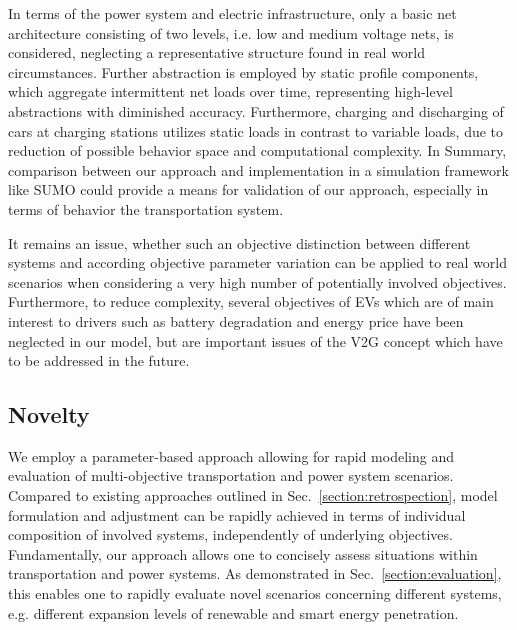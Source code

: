 In terms of the power system and electric infrastructure, only a basic net architecture consisting of two levels, i.e. low and medium voltage nets, is considered, neglecting a representative structure found in real world circumstances. Further abstraction is employed by static profile components, which aggregate intermittent net loads over time, representing high-level abstractions with diminished accuracy. Furthermore, charging 
and discharging of cars at charging stations utilizes static loads in contrast to variable loads, due to reduction of possible behavior space and computational complexity. In Summary, comparison between our approach and implementation in a simulation framework like SUMO could provide a means for validation of our approach, especially in terms of behavior the transportation system.

It remains an issue, whether such an objective distinction between different systems and according objective parameter variation can be applied to real world scenarios when considering a very high number of potentially involved objectives. Furthermore, to reduce complexity, several objectives of EVs which are of main interest to drivers such as battery degradation and energy price have been neglected in our model, but are important issues of the V2G concept which have to be addressed in the future.

\subsection{Novelty}

We employ a parameter-based approach allowing for rapid modeling and evaluation of multi-objective transportation and power system scenarios. Compared to existing approaches outlined in Sec.~\ref{section:retrospection}, model formulation and adjustment can be rapidly achieved in terms of individual composition of involved systems, independently of underlying objectives. Fundamentally, our approach allows one to concisely assess situations within transportation and power systems. As demonstrated in Sec.~\ref{section:evaluation}, this enables one to rapidly evaluate novel scenarios concerning different systems, e.g. different expansion levels of renewable and smart energy penetration. 

